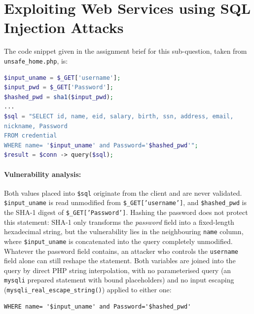 \section{Exploiting Web Services using SQL Injection \mbox{Attacks}}


The code snippet given in the assignment brief for this sub-question, taken
from \texttt{unsafe\_home.php}, is:

\begin{lstlisting}[language=PHP]
$input_uname = $_GET['username'];
$input_pwd = $_GET['Password'];
$hashed_pwd = sha1($input_pwd);
...
$sql = "SELECT id, name, eid, salary, birth, ssn, address, email,
nickname, Password
FROM credential
WHERE name= '$input_uname' and Password='$hashed_pwd'";
$result = $conn -> query($sql);
\end{lstlisting}

\dranswer

\paragraph{Vulnerability analysis:} Both values placed into \texttt{\$sql}
originate from the client and are never validated. \texttt{\$input\_uname} is
read unmodified from \texttt{\$\_GET['username']}, and \texttt{\$hashed\_pwd}
is the SHA-1 digest of \texttt{\$\_GET['Password']}. Hashing the password does
not protect this statement: SHA-1 only transforms the \emph{password} field
into a fixed-length hexadecimal string, but the vulnerability lies in the
neighbouring \texttt{name} column, where \texttt{\$input\_uname} is
concatenated into the query completely unmodified. Whatever the password
field contains, an attacker who controls the \texttt{username} field alone can
still reshape the statement. Both variables are joined into the query by
direct PHP string interpolation, with no parameterised query (an
\texttt{mysqli} prepared statement with bound placeholders) and no input
escaping (\texttt{mysqli\_real\_escape\_string()}) applied to either one:

\begin{lstlisting}[language={[MySQL]SQL}]
WHERE name= '$input_uname' and Password='$hashed_pwd'
\end{lstlisting}

